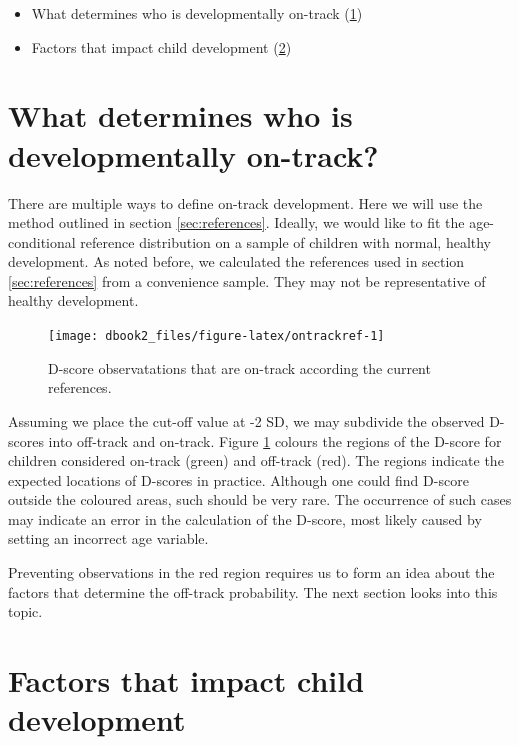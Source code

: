 \documentclass[
]{book}
\providecommand{\tightlist}{%
  \setlength{\itemsep}{0pt}\setlength{\parskip}{0pt}}
\begin{document}
\begin{itemize}
\tightlist
\item
  What determines who is developmentally on-track (\ref{sec:application2})
\item
  Factors that impact child development (\ref{sec:factors})
\end{itemize}

\hypertarget{sec:application2}{%
\section{What determines who is developmentally on-track?}\label{sec:application2}}

There are multiple ways to define on-track development. Here we will use the method outlined in section \ref{sec:references}. Ideally, we would like to fit the age-conditional reference distribution on a sample of children with normal, healthy development. As noted before, we calculated the references used in section \ref{sec:references} from a convenience sample. They may not be representative of healthy development.

\begin{figure}

{\centering \texttt{[image: dbook2\_files/figure-latex/ontrackref-1]} 

}

\caption{D-score observatations that are on-track according the current references.}\label{fig:ontrackref}
\end{figure}



Assuming we place the cut-off value at -2 SD, we may subdivide the observed D-scores into off-track and on-track. Figure \ref{fig:ontrackref} colours the regions of the D-score for children considered on-track (green) and off-track (red). The regions indicate the expected locations of D-scores in practice. Although one could find D-score outside the coloured areas, such should be very rare. The occurrence of such cases may indicate an error in the calculation of the D-score, most likely caused by setting an incorrect age variable.

Preventing observations in the red region requires us to form an idea about the factors that determine the off-track probability. The next section looks into this topic.

\hypertarget{sec:factors}{%
\section{Factors that impact child development}\label{sec:factors}}
\end{document}
